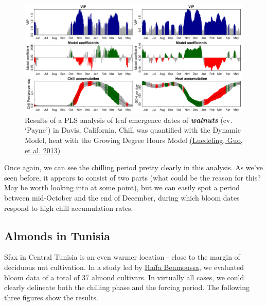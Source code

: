 \documentclass[
]{book}
\begin{document}
\begin{figure}
\centering
\includegraphics{pictures/PLS_chill_force_walnut_CA.png}
\caption{Results of a PLS analysis of leaf emergence dates of \textbf{\emph{walnuts}} (cv. `Payne') in Davis, California. Chill was quantified with the Dynamic Model, heat with the Growing Degree Hours Model \href{https://www.sciencedirect.com/science/article/pii/S0168192313001780}{(Luedeling, Guo, et al. \protect\hyperlink{ref-luedeling2013differential}{2013})}}
\end{figure}

Once again, we can see the chilling period pretty clearly in this analysis. As we've seen before, it appears to consist of two parts (what could be the reason for this? May be worth looking into at some point), but we can easily spot a period between mid-October and the end of December, during which bloom dates respond to high chill accumulation rates.

\hypertarget{almonds-in-tunisia}{%
\subsection{Almonds in Tunisia}\label{almonds-in-tunisia}}

Sfax in Central Tunisia is an even warmer location - close to the margin of deciduous nut cultivation. In a study led by \href{https://scholar.google.com/citations?user=DdV9jsAAAAAJ\&hl}{Haïfa Benmoussa}, we evaluated bloom data of a total of 37 almond cultivars. In virtually all cases, we could clearly delineate both the chilling phase and the forcing period. The following three figures show the results.
\end{document}
